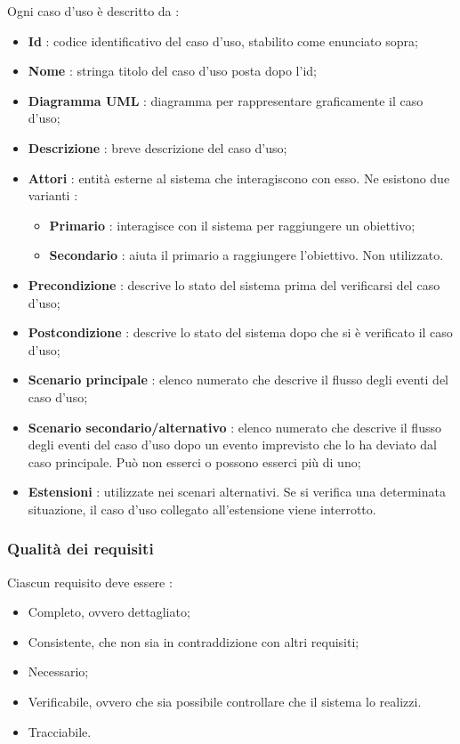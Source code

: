 Ogni caso d'uso è descritto da : 
\begin{itemize}
    \item \textbf{Id} : codice identificativo del caso d'uso, stabilito come enunciato sopra;
    \item \textbf{Nome} : stringa titolo del caso d'uso posta dopo l'id;
    \item \textbf{Diagramma UML} : diagramma per rappresentare graficamente il caso d'uso;
    \item \textbf{Descrizione} : breve descrizione del caso d'uso;
    \item \textbf{Attori} : entità esterne al sistema che interagiscono con esso. Ne esistono due varianti : 
    \begin{itemize}
    \item \textbf{Primario} : interagisce con il sistema per raggiungere un obiettivo;
    \item \textbf{Secondario} : aiuta il primario a raggiungere l'obiettivo. Non utilizzato.
    \end{itemize}
    \item \textbf{Precondizione} : descrive lo stato del sistema prima del verificarsi del caso d'uso;
    \item \textbf{Postcondizione} : descrive lo stato del sistema dopo che si è verificato il caso d'uso;
    \item \textbf{Scenario principale} : elenco numerato che descrive il flusso degli eventi del caso d'uso;
    \item \textbf{Scenario secondario/alternativo} : elenco numerato che descrive il flusso degli eventi del caso d'uso dopo un evento imprevisto che lo ha deviato dal caso principale. Può non esserci o possono esserci più di uno;
    \item \textbf{Estensioni} : utilizzate nei scenari alternativi. Se si verifica una determinata situazione, il caso d'uso collegato all'estensione viene interrotto.
\end{itemize}

\subsubsection{Qualità dei requisiti}
Ciascun requisito deve essere :
\begin{itemize}
  \item Completo, ovvero dettagliato;
  \item Consistente, che non sia in contraddizione con altri requisiti;
  \item Necessario;
  \item Verificabile, ovvero che sia possibile controllare che il sistema lo realizzi.
  \item Tracciabile.
\end{itemize}

